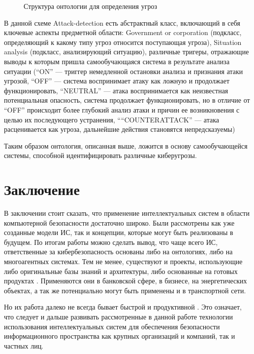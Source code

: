 \begin{figure}[h]
    \caption{Структура онтологии для определения угроз \cite{wars}}
    \label{ont}
\end{figure}

В данной схеме Attack-detection есть абстрактный класс, включающий в себя ключевые аспекты предметной
области: Government or corporation (подкласс, определяющий к какому типу угроз относится поступающая угроза),
Situation analysis (подкласс, анализирующий ситуацию), различные тригеры, отражающие выводы к которым пришла
самообучающаяся система в результате анализа ситуации (``ON'' --- триггер немедленной остановки анализа и
признания атаки угрозой, ``OFF'' --- система воспринимает атаку как ложную и продолжает функционировать,
``NEUTRAL'' --- атака воспринимается как неизвестная потенциальная опасность, система продолжает функционировать,
но в отличие от ``OFF'' происходит более глубокий анализ атаки и причин ее возникновения с целью их
последующего устранения, ``“COUNTERATTACK'' --- атака расценивается как угроза, дальнейшие действия становятся
непредсказуемы)

Таким образом онтология, описанная выше, ложится в основу самообучающейся системы, способной идентифицировать
различные киберугрозы.

\section{Заключение}
В заключении стоит сказать, что применение интеллектуальных систем в области компьютерной безопасности
достаточно широко. Были рассмотрены как уже созданные модели ИС, так и концепции, которые могут
быть реализованы в будущем. По итогам работы можно сделать вывод, что чаще всего ИС, ответственные за
кибербезопасность основаны либо на онтологиях, либо на многоагентных системах. Тем не менее,
существуют и проекты, использующие либо оригинальные базы знаний и архитектуры, либо основанные на
готовых продуктах \cite{concept, wars}. Применяются они в банковской
сфере, в бизнесе, на энергетических объектах, а так же потенциально могут быть применены и в транспортной сети.

Но их работа далеко не всегда бывает быстрой и продуктивной \cite{mob, upg}. Это означает,
что следует и дальше развивать рассмотренные в данной работе технологии использования интеллектуальных
систем для обеспечения безопасности информационного пространства как крупных организаций и компаний, так
и частных лиц.
\newpage

